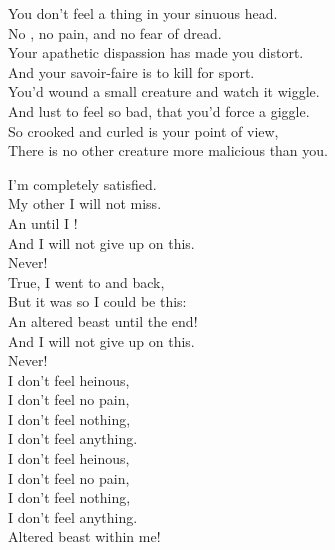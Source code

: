 



You don't feel a thing in your sinuous head. \\
No , no pain, and no fear of dread. \\

Your apathetic dispassion has made you distort. \\
And your savoir-faire is to kill for sport. \\

You'd wound a small creature and watch it wiggle. \\
And lust to feel so bad, that you'd force a giggle. \\

So crooked and curled is your point of view, \\
There is no other creature more malicious than you. \\


I'm completely satisfied. \\
My other  I will not miss. \\
An  until I ! \\
And I will not give up on this. \\
Never! \\

True, I went to  and back, \\
But it was so I could be this: \\
An altered beast until the end! \\
And I will not give up on this. \\
Never! \\

I don't feel heinous, \\
I don't feel no pain, \\
I don't feel nothing, \\
I don't feel anything. \\
I don't feel heinous, \\
I don't feel no pain, \\
I don't feel nothing, \\
I don't feel anything. \\
Altered beast within me! \\

